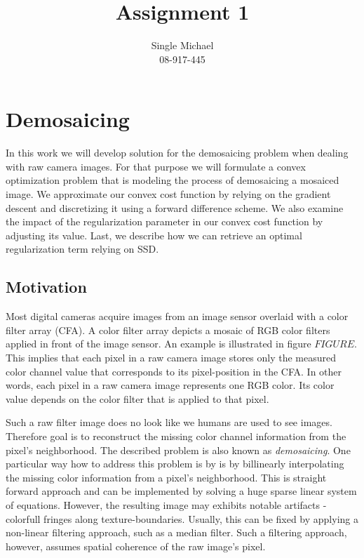 \documentclass{paper}
\title{Assignment 1}
\author{Single Michael\\08-917-445}
\begin{document}
\maketitle


%

\section{Demosaicing}
In this work we will develop solution for the demosaicing problem when dealing with raw camera images. For that purpose we will formulate a convex optimization problem that is modeling the process of demosaicing a mosaiced image. We approximate our convex cost function by relying on the gradient descent and discretizing it using a forward difference scheme. We also examine the impact of the regularization parameter in our convex cost function by adjusting its value. Last, we describe how we can retrieve an optimal regularization term relying on SSD. 

\subsection{Motivation}
Most digital cameras acquire images from an image sensor overlaid with a color filter array (CFA). A color filter array depicts a mosaic of RGB color filters applied in front of the image sensor. An example is illustrated in figure $FIGURE$. This implies that each pixel in a raw camera image stores only the measured color channel value that corresponds to its pixel-position in the CFA. In other words, each pixel in a raw camera image represents one RGB color. Its color value depends on the color filter that is applied to that pixel. 

Such a raw filter image does no look like we humans are used to see images. Therefore goal is to reconstruct the missing color channel information from the pixel's neighborhood. The described problem is also known as \emph{demosaicing}. One particular way how to address this problem is by is by billinearly interpolating the missing color information from a pixel's neighborhood. This is straight forward approach and can be implemented by solving a huge sparse linear system of equations. However, the resulting image may exhibits notable artifacts - colorfull fringes along texture-boundaries. Usually, this can be fixed by applying a non-linear filtering approach, such as a median filter. Such a filtering approach, however, assumes spatial coherence of the raw image's pixel.
\end{document}
